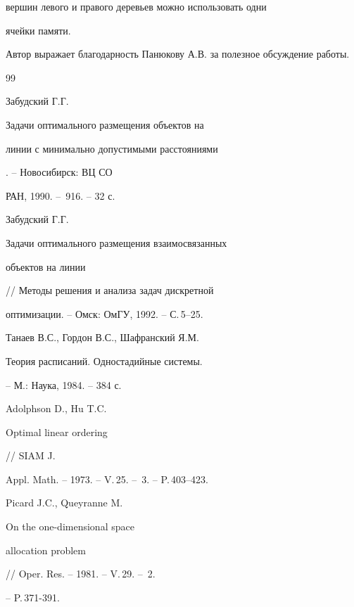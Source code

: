 вершин левого и правого деревьев можно использовать одни


ячейки памяти.





Автор выражает благодарность Панюкову А.В. за полезное обсуждение работы.





\begin{thebibliography}{99}







Забудский Г.Г. {\em


Задачи оптимального размещения объектов на


линии с минимально допустимыми расстояниями}. -- Новосибирск: ВЦ СО


РАН, 1990. -- \No\,916. -- 32 с.







Забудский Г.Г. {\em


Задачи оптимального размещения взаимосвязанных


объектов на линии} // Методы решения и анализа задач дискретной


оптимизации. -- Омск: ОмГУ, 1992. -- С.\,5--25.







Танаев В.С., Гордон В.С., Шафранский Я.М. {\em


Теория расписаний. Одностадийные системы.} -- М.: Наука, 1984. -- 384 с.







Adolphson D., Hu T.C. {\em


Optimal linear ordering} // SIAM J.


Appl. Math. -- 1973. -- V.\,25. -- \No\,3. -- P.\,403--423.







Picard J.C., Queyranne M. {\em


On the one-dimensional space


allocation problem} // Oper. Res. -- 1981. -- V.\,29. -- \No\,2.


-- P.\,371-391.





\end{thebibliography}





\vskip 2cm




















